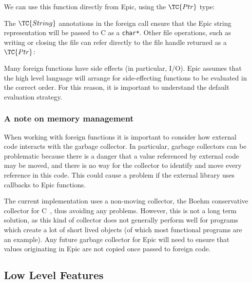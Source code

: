 \noindent
We can use this function directly from Epic, using the $\TC{Ptr}$
type:


\noindent
The $\TC{String}$ annotations in the foreign call ensure that the Epic
string representation will be passed to C as a \texttt{char*}. Other
file operations, such as writing or closing the file can refer
directly to the file handle returned as a $\TC{Ptr}$: 


\noindent
Many foreign functions have side effects (in particular, I/O). Epic
assumes that the high level language will arrange for side-effecting
functions to be evaluated in the correct order. For this reason, it is
important to understand the default evaluation strategy.

\subsubsection*{A note on memory management}

When working with foreign functions it is important to consider how
external code interacts with the garbage collector. In particular,
 garbage collectors can be problematic because there is
a danger that a value referenced by external code may be moved, and
there is no way for the collector to identify and move every reference
in this code. This could cause a problem if the external library uses
callbacks to Epic functions.

The current implementation uses a non-moving collector, the Boehm
conservative collector for C~\cite{boehm-gc}, thus avoiding any
problems. However, this is not a long term solution, as this kind of
collector does not generally perform well for programs which create a
lot of short lived objects (of which most functional programs are an
example). Any future garbage collector for Epic will need to ensure
that values originating in Epic are not copied once passed to foreign
code.

\subsection{Low Level Features}

